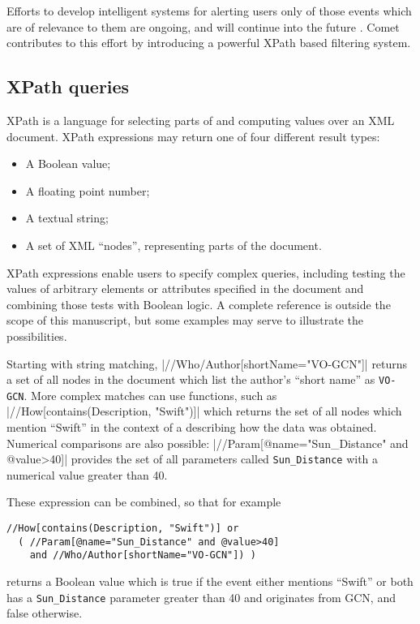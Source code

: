 \documentclass[5p,authoryear]{elsarticle}
\begin{document}
Efforts to develop intelligent systems for alerting users only of those events
which are of relevance to them are ongoing, and will continue into the future
\citep{Williams:2009, Matheson:2014}. Comet contributes to this effort by
introducing a powerful XPath \citep{Clark:1999} based filtering system.

\subsection{XPath queries}

XPath is a language for selecting parts of and computing values over an XML
document. XPath expressions may return one of four different result types:

\begin{itemize}
  \item{A Boolean value;}
  \item{A floating point number;}
  \item{A textual string;}
  \item{A set of XML ``nodes'', representing parts of the document.}
\end{itemize}

XPath expressions enable users to specify complex queries, including testing
the values of arbitrary elements or attributes specified in the document and
combining those tests with Boolean logic. A complete reference is outside the
scope of this manuscript, but some examples may serve to illustrate the
possibilities.

Starting with string matching, |//Who/Author[shortName="VO-GCN"]|
returns a set of all nodes in the document which list the author's ``short
name'' as \texttt{VO-GCN}. More complex matches can use functions, such as
|//How[contains(Description, "Swift")]| which returns the set of all
nodes which mention ``Swift'' in the context of a describing how the data was
obtained. Numerical comparisons are also possible:
|//Param[@name="Sun_Distance" and @value>40]| provides the set of
all parameters called \texttt{Sun\_Distance} with a numerical value greater
than 40.

These expression can be combined, so that for example
\begin{verbatim}
//How[contains(Description, "Swift")] or
  ( //Param[@name="Sun_Distance" and @value>40]
    and //Who/Author[shortName="VO-GCN"]) )
\end{verbatim}
returns a Boolean value which is true if the event either mentions ``Swift''
or both has a \texttt{Sun\_Distance} parameter greater than 40 and originates
from GCN, and false otherwise.
\end{document}
